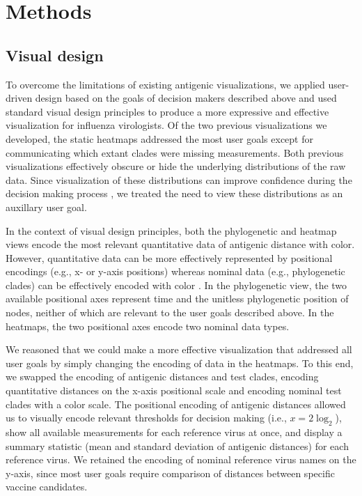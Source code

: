 \documentclass[utf8]{FrontiersinHarvard} %
\begin{document}
\section{Methods}

\subsection{Visual design}

To overcome the limitations of existing antigenic visualizations, we applied user-driven design based on the goals of decision makers described above and used standard visual design principles to produce a more expressive and effective visualization for influenza virologists.
Of the two previous visualizations we developed, the static heatmaps addressed the most user goals except for communicating which extant clades were missing measurements.
Both previous visualizations effectively obscure or hide the underlying distributions of the raw data.
Since visualization of these distributions can improve confidence during the decision making process \citep{correll2014error,Hullman2015,Fernandes2018}, we treated the need to view these distributions as an auxillary user goal.

In the context of visual design principles, both the phylogenetic and heatmap views encode the most relevant quantitative data of antigenic distance with color.
However, quantitative data can be more effectively represented by positional encodings (e.g., x- or y-axis positions) whereas nominal data (e.g., phylogenetic clades) can be effectively encoded with color \citep{Mackinlay1986}.
In the phylogenetic view, the two available positional axes represent time and the unitless phylogenetic position of nodes, neither of which are relevant to the user goals described above.
In the heatmaps, the two positional axes encode two nominal data types.

We reasoned that we could make a more effective visualization that addressed all user goals by simply changing the encoding of data in the heatmaps.
To this end, we swapped the encoding of antigenic distances and test clades, encoding quantitative distances on the x-axis positional scale and encoding nominal test clades with a color scale.
The positional encoding of antigenic distances allowed us to visually encode relevant thresholds for decision making (i.e., $x = 2\log_{2}$), show all available measurements for each reference virus at once, and display a summary statistic (mean and standard deviation of antigenic distances) for each reference virus.
We retained the encoding of nominal reference virus names on the y-axis, since most user goals require comparison of distances between specific vaccine candidates.
\end{document}
